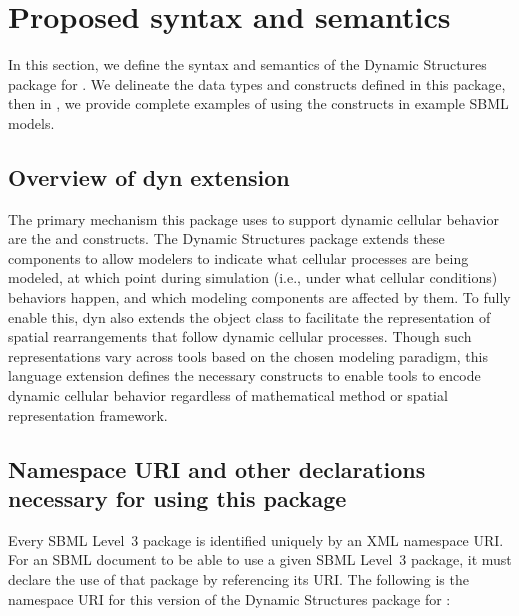 
\section{Proposed syntax and semantics}
\label{sec:syntax}

In this section, we define the syntax and semantics of the Dynamic Structures package for \sbmlthree. We delineate the data types and constructs defined in this package, then in , we provide complete examples of using the constructs in example SBML models.

\subsection{Overview of dyn extension}
\label{subsec:overview}

The primary mechanism this package uses to support dynamic cellular behavior are the \Event and \SBase constructs. The Dynamic Structures package extends these components to allow modelers to indicate what cellular processes are being modeled, at which point during simulation (i.e., under what cellular conditions) behaviors happen, and which modeling components are affected by them. To fully enable this, dyn also extends the \Compartment object class to facilitate the representation of spatial rearrangements that follow dynamic cellular processes. Though such representations vary across tools based on the chosen modeling paradigm, this language extension defines the necessary constructs to enable tools to encode dynamic cellular behavior regardless of mathematical method or spatial representation framework.

\subsection{Namespace URI and other declarations necessary for using this package}
\label{subsec:xml-namespace}

Every SBML Level~3 package is identified uniquely by an XML namespace URI.
For an SBML document to be able to use a given SBML Level~3 package, it
must declare the use of that package by referencing its URI.  The following
is the namespace URI for this version of the Dynamic Structures
package for \sbmlthree:

\begin{center}
\end{center}


